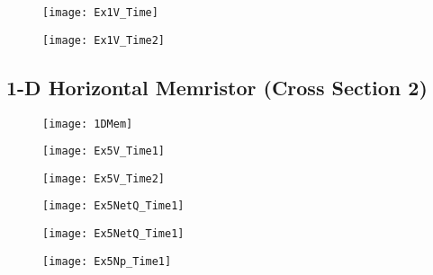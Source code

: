 \begin{landscape}
\begin{figure}[!htp]
\centering
\texttt{[image: Ex1V\_Time]}
\caption{} 
\label{}
\end{figure}
\end{landscape}

\begin{landscape}
\begin{figure}[!htp]
\centering
\texttt{[image: Ex1V\_Time2]}
\caption{} 
\label{}
\end{figure}
\end{landscape}

\clearpage
\subsection{1-D Horizontal Memristor (Cross Section 2)}

\begin{figure}[!htp]
\centering
\texttt{[image: 1DMem]}
\caption{} 
\label{}
\end{figure}


\begin{landscape}
\begin{figure}[!htp]
\centering
\texttt{[image: Ex5V\_Time1]}
\caption{} 
\label{}
\end{figure}
\end{landscape}

\begin{landscape}
\begin{figure}[!htp]
\centering
\texttt{[image: Ex5V\_Time2]}
\caption{} 
\label{}
\end{figure}
\end{landscape}

\begin{landscape}
\begin{figure}[!htp]
\centering
\texttt{[image: Ex5NetQ\_Time1]}
\caption{} 
\label{}
\end{figure}
\end{landscape}

\begin{landscape}
\begin{figure}[!htp]
\centering
\texttt{[image: Ex5NetQ\_Time1]}
\caption{} 
\label{}
\end{figure}
\end{landscape}

\begin{landscape}
\begin{figure}[!htp]
\centering
\texttt{[image: Ex5Np\_Time1]}
\caption{} 
\label{}
\end{figure}
\end{landscape}


